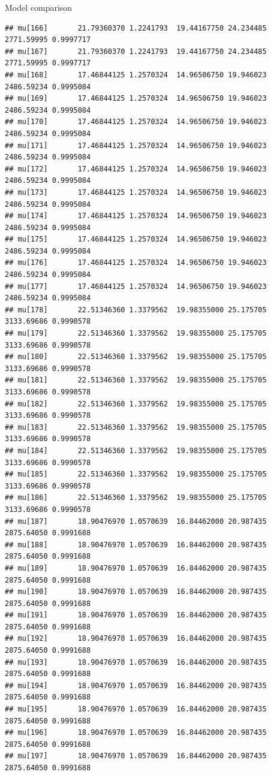 \documentclass[
  ignorenonframetext,
]{beamer}
\begin{document}
\begin{frame}[fragile]{Model comparison}
\begin{verbatim}
## mu[166]       21.79360370 1.2241793  19.44167750 24.234485 2771.59995 0.9997717
## mu[167]       21.79360370 1.2241793  19.44167750 24.234485 2771.59995 0.9997717
## mu[168]       17.46844125 1.2570324  14.96506750 19.946023 2486.59234 0.9995084
## mu[169]       17.46844125 1.2570324  14.96506750 19.946023 2486.59234 0.9995084
## mu[170]       17.46844125 1.2570324  14.96506750 19.946023 2486.59234 0.9995084
## mu[171]       17.46844125 1.2570324  14.96506750 19.946023 2486.59234 0.9995084
## mu[172]       17.46844125 1.2570324  14.96506750 19.946023 2486.59234 0.9995084
## mu[173]       17.46844125 1.2570324  14.96506750 19.946023 2486.59234 0.9995084
## mu[174]       17.46844125 1.2570324  14.96506750 19.946023 2486.59234 0.9995084
## mu[175]       17.46844125 1.2570324  14.96506750 19.946023 2486.59234 0.9995084
## mu[176]       17.46844125 1.2570324  14.96506750 19.946023 2486.59234 0.9995084
## mu[177]       17.46844125 1.2570324  14.96506750 19.946023 2486.59234 0.9995084
## mu[178]       22.51346360 1.3379562  19.98355000 25.175705 3133.69686 0.9990578
## mu[179]       22.51346360 1.3379562  19.98355000 25.175705 3133.69686 0.9990578
## mu[180]       22.51346360 1.3379562  19.98355000 25.175705 3133.69686 0.9990578
## mu[181]       22.51346360 1.3379562  19.98355000 25.175705 3133.69686 0.9990578
## mu[182]       22.51346360 1.3379562  19.98355000 25.175705 3133.69686 0.9990578
## mu[183]       22.51346360 1.3379562  19.98355000 25.175705 3133.69686 0.9990578
## mu[184]       22.51346360 1.3379562  19.98355000 25.175705 3133.69686 0.9990578
## mu[185]       22.51346360 1.3379562  19.98355000 25.175705 3133.69686 0.9990578
## mu[186]       22.51346360 1.3379562  19.98355000 25.175705 3133.69686 0.9990578
## mu[187]       18.90476970 1.0570639  16.84462000 20.987435 2875.64050 0.9991688
## mu[188]       18.90476970 1.0570639  16.84462000 20.987435 2875.64050 0.9991688
## mu[189]       18.90476970 1.0570639  16.84462000 20.987435 2875.64050 0.9991688
## mu[190]       18.90476970 1.0570639  16.84462000 20.987435 2875.64050 0.9991688
## mu[191]       18.90476970 1.0570639  16.84462000 20.987435 2875.64050 0.9991688
## mu[192]       18.90476970 1.0570639  16.84462000 20.987435 2875.64050 0.9991688
## mu[193]       18.90476970 1.0570639  16.84462000 20.987435 2875.64050 0.9991688
## mu[194]       18.90476970 1.0570639  16.84462000 20.987435 2875.64050 0.9991688
## mu[195]       18.90476970 1.0570639  16.84462000 20.987435 2875.64050 0.9991688
## mu[196]       18.90476970 1.0570639  16.84462000 20.987435 2875.64050 0.9991688
## mu[197]       18.90476970 1.0570639  16.84462000 20.987435 2875.64050 0.9991688

\end{verbatim}
\end{frame}
\end{document}

